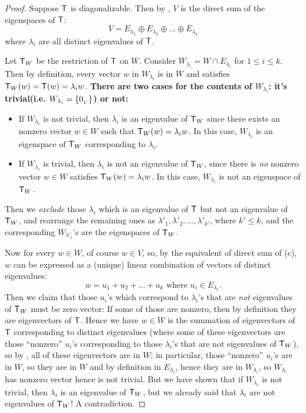 \begin{proof}

Suppose \(\textsf{T}\) is diagonalizable.
Then by , \(V\) is the direct sum of the eigenspaces of \(\textsf{T}\):
\[
    V = E_{\lambda_1} \oplus E_{\lambda_2} \oplus ... \oplus E_{\lambda_k}
\]
where \(\lambda_i\) are all distinct eigenvalues of \(\textsf{T}\).

Let \(\textsf{T}_W\) be the restriction of \(\textsf{T}\) on \(W\).
Consider \(W_{\lambda_i} = W \cap E_{\lambda_i}\) for \(1 \le i \le k\).
Then by definition, every vector \(w\) in \(W_{\lambda_i}\) is in \(W\) and satisfies \(\textsf{T}_W(w) = \textsf{T}(w) = \lambda_i w\).
\textbf{There are two cases for the contents of \(W_{\lambda_i}\): it's trivial(i.e. \(W_{\lambda_i} = \{ 0_{_V} \}\)) or not:}
\begin{itemize}
\item If \(W_{\lambda_i}\) is not trivial, then \(\lambda_i\) is an eigenvalue of \(\textsf{T}_W\) since there exists an nonzero vector \(w \in W\) such that \(\textsf{T}_W(w) = \lambda_i w\).
In this case, \(W_{\lambda_i}\) is an eigenspace of \(\textsf{T}_W\) corresponding to \(\lambda_i\).
\item If \(W_{\lambda_i}\) is trivial, then \(\lambda_i\) is not an eigenvalue of \(\textsf{T}_W\), since there is \emph{no} nonzero vector \(w \in W\) satisfies \(\textsf{T}_W(w) = \lambda_i w\).
In this case, \(W_{\lambda_i}\) is not an eigenspace of \(\textsf{T}_W\).
\end{itemize}

Then we \emph{exclude} those \(\lambda_i\) which is an eigenvalue of \(\textsf{T}\) but not an eigenvalue of \(\textsf{T}_W\),
and rearrange the remaining ones as \(\lambda'_1, \lambda'_2, ..., \lambda'_{k'}\), where \(k' \le k\), and the corresponding \(W_{\lambda'_{i}}\)'s are the eigenspaces of \(\textsf{T}_W\).

Now for every \(w \in W\), of course \(w \in V\), so, by the equivalent of direct sum of (c), \(w\) can be expressed as a (unique) linear combination of vectors of distinct eigenvalues:
\[
    w = u_1 + u_2 + ... + u_k \text{ where } u_i \in E_{\lambda_i}.
\]
Then we claim that those \(u_i\)'s which correspond to \(\lambda_i\)'s that are \emph{not} eigenvalues of \(\textsf{T}_W\) must be zero vector:
If some of those are nonzero, then by definition they are eigenvectors of \(\textsf{T}\).
Hence we have \(w \in W\) is the summation of eigenvectors of \(\textsf{T}\) corresponding to distinct eigenvalues (where some of these eigenvectors are those ``nonzero'' \(u_i\)'s corresponding to those \(\lambda_i\)'s that are not eigenvalues of \(\textsf{T}_W\)),
so by , all of these eigenvectors are in \(W\);
in particular, those ``nonzero'' \(u_i\)'s are in \(W\), so they are in \(W\) and by definition in \(E_{\lambda_i}\), hence they are in \(W_{\lambda_i}\), so \(W_{\lambda_i}\) has nonzero vector hence is not trivial.
But we have shown that if \(W_{\lambda_i}\) is not trivial, then \(\lambda_i\) is an eigenvalue of \(\textsf{T}_W\), but we already said that \(\lambda_i\) are not eigenvalues of \(\textsf{T}_W\)! A contradiction.


\end{proof}
